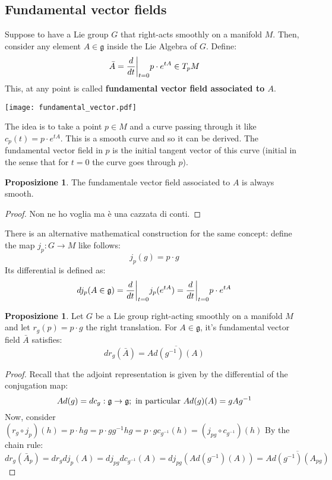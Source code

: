 \documentclass[12pt,a4paper]{report}
\theoremstyle{definition}
\theoremstyle{Theorem}
\newtheorem{Prop}[Def]{Proposizione}
\theoremstyle{definition}
\theoremstyle{definition}
\theoremstyle{definition}
\begin{document}
		\subsection{Fundamental vector fields}
		Suppose to have a Lie group $G$ that right-acts smoothly on a manifold $M$. Then, consider any element $A\in\mathfrak{g}$ inside the Lie Algebra of $G$. Define:
		$$\bar{A}={d\over dt}\bigg|_{t=0}p\cdot e^{tA}\in T_pM$$
		This, at any point is called \textbf{fundamental vector field associated to $A$}.\\
		\begin{center}
			\texttt{[image: fundamental\_vector.pdf]}
		\end{center}
		The idea is to take a point $p\in M$ and a curve passing through it like $c_p(t)=p\cdot e^{tA}$. This is a smooth curve and so it can be derived. The fundamental vector field in $p$ is the initial tangent vector of this curve (initial in the sense that for $t=0$ the curve goes through $p$).
		\begin{Prop}
			The fundamentale vector field associated to $A$ is always smooth.
		\end{Prop}
		\begin{proof}
			Non ne ho voglia ma è una cazzata di conti.
		\end{proof}
		There is an alternative mathematical construction for the same concept: define the map $j_p:G\rightarrow M$ like follows:
		$$j_p(g)=p\cdot g$$
		Its differential is defined as:
		$$dj_p(A\in\mathfrak{g})={d\over dt}\bigg|_{t=0}j_p(e^{tA})={d\over dt}\bigg|_{t=0}p\cdot e^{tA}$$
		\begin{Prop}
			Let $G$ be a Lie group right-acting smoothly on a manifold $M$ and let $r_g(p)=p\cdot g$ the right translation. For $A\in\mathfrak{g}$, it's fundamental vector field $\bar{A}$ satisfies:
			$$dr_g(\bar{A})=\overline{Ad(g^{-1})(A)}$$
		\end{Prop}
		\begin{proof}
			Recall that the adjoint representation is given by the differential of the conjugation map:
			$$Ad(g)=dc_g:\mathfrak{g}\rightarrow\mathfrak{g};\hbox{ in particular }Ad(g)(A)=gAg^{-1}$$
			Now, consider $(r_g\circ j_p)(h)=p\cdot hg=p\cdot gg^{-1}hg=p\cdot g c_{g^{-1}}(h)=(j_{pg}\circ c_{g^{-1}})(h)$
			By the chain rule:
			$$dr_g(\bar{A}_p)=dr_gdj_p(A)=dj_{pg}dc_{g^{-1}}(A)=dj_{pg}(Ad(g^{-1})(A))=\overline{Ad(g^{-1})(A_{pg})}$$
		\end{proof}
\end{document}
